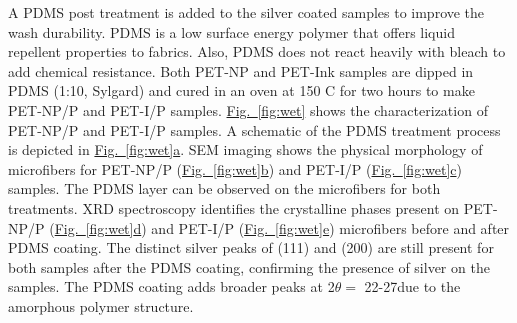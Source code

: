 \documentclass[journal=jacsat,manuscript=article]{achemso}
\newcommand{\figref}[2][]{\hyperref[#2]{Fig.~\ref{#2}#1}}
\begin{document}
A PDMS post treatment is added to the silver coated samples to improve the wash durability. PDMS is a low surface energy polymer that offers liquid repellent properties to fabrics.\cite{ye_2018} 
Also, PDMS does not react heavily with bleach to add chemical resistance. Both PET-NP and PET-Ink samples are dipped in PDMS (1:10, Sylgard) and cured in an oven at 150 \degree C for two hours to make PET-NP/P and PET-I/P samples. 
\figref{fig:wet} shows the characterization of PET-NP/P and PET-I/P samples. A schematic of the  PDMS treatment process is depicted in \figref[a]{fig:wet}.
SEM imaging shows the physical morphology of microfibers for PET-NP/P (\figref[b]{fig:wet}) and PET-I/P (\figref[c]{fig:wet}) samples. The PDMS layer can be observed on the microfibers for both treatments. 
XRD spectroscopy identifies the crystalline phases present on PET-NP/P (\figref[d]{fig:wet}) and PET-I/P (\figref[e]{fig:wet}) microfibers before and after PDMS coating. The distinct silver peaks of (111) and (200) are still present for both samples after the PDMS coating, confirming the presence of silver on the samples. The PDMS coating adds broader peaks at 2$\theta =$ 22-27\degree due to the amorphous polymer structure. 
\end{document}
